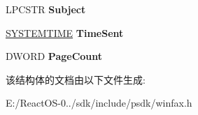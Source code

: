 \begin{DoxyCompactItemize}
L\+P\+C\+S\+TR {\bfseries Subject}
\item 
\mbox{\label{struct___f_a_x___c_o_v_e_r_a_g_e___i_n_f_o_a_af37ce460feda24a2756ff78713bedddb}} 
\hyperlink{struct___s_y_s_t_e_m_t_i_m_e}{S\+Y\+S\+T\+E\+M\+T\+I\+ME} {\bfseries Time\+Sent}
\item 
\mbox{\label{struct___f_a_x___c_o_v_e_r_a_g_e___i_n_f_o_a_a4aad939ae3e02fb32f37359efea35c27}} 
D\+W\+O\+RD {\bfseries Page\+Count}
\end{DoxyCompactItemize}


该结构体的文档由以下文件生成\+:\begin{DoxyCompactItemize}
\item 
E\+:/\+React\+O\+S-\/0../sdk/include/psdk/winfax.\+h\end{DoxyCompactItemize}
